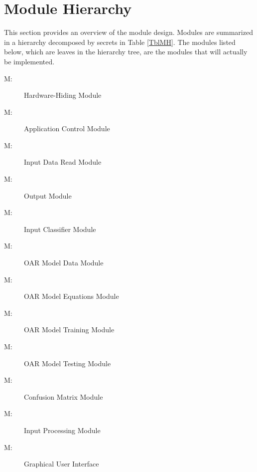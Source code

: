 \documentclass[12pt, titlepage]{article}
\newcounter{mnum}
\newcommand{\mthemnum}{M\themnum}
\begin{document}
\section{Module Hierarchy} \label{SecMH}

This section provides an overview of the module design. Modules are summarized
in a hierarchy decomposed by secrets in Table \ref{TblMH}. The modules listed
below, which are leaves in the hierarchy tree, are the modules that will
actually be implemented.

\begin{description}
\item [ \mthemnum \label{mHH}:] Hardware-Hiding Module
\item [ \mthemnum \label{mAC}:] Application Control Module
\item [ \mthemnum \label{mIDR}:] Input Data Read Module
\item [ \mthemnum \label{mOU}:] Output Module
\item [ \mthemnum \label{mIC}:] Input Classifier Module
\item [ \mthemnum \label{mOMD}:] OAR Model Data Module
\item [ \mthemnum \label{mOME}:] OAR Model Equations Module
\item [ \mthemnum \label{mOMTr}:] OAR Model Training Module
\item [ \mthemnum \label{mOMTs}:] OAR Model Testing Module
\item [ \mthemnum \label{mCMX}:] Confusion Matrix Module
\item [ \mthemnum \label{mIP}:] Input Processing Module
\item [ \mthemnum \label{mGUI}:] Graphical User Interface
\end{description}
\end{document}
